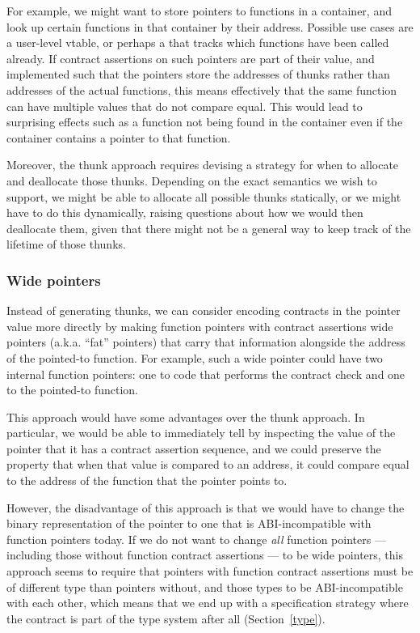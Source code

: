 For example, we might want to store pointers to functions in a container, and look up certain functions in that container by their address. Possible use cases are a user-level vtable, or perhaps a  that tracks which functions have been called already.  If contract assertions on such pointers are part of their value, and implemented such that the pointers store the addresses of thunks rather than addresses of the actual functions, this means effectively that the same function can have multiple values that do not compare equal. This would lead to surprising effects such as a function not being found in the container even if the container contains a pointer to that function.

Moreover, the thunk approach requires devising a strategy for when to allocate and deallocate those thunks. Depending on the exact semantics we wish to support, we might be able to allocate all possible thunks statically, or we might have to do this dynamically, raising questions about how we would then deallocate them, given that there might not be a general way to keep track of the lifetime of those thunks.


\subsubsection{Wide pointers}

Instead of generating thunks, we can consider encoding contracts in the pointer value more directly by making function pointers with contract assertions wide pointers (a.k.a. ``fat'' pointers) that carry that information alongside the address of the pointed-to function. For example, such a wide pointer could have two internal function pointers: one to code that performs the contract check and one to the pointed-to function. 

This approach would have some advantages over the thunk approach. In particular, we would be able to immediately tell by inspecting the value of the pointer that it has a contract assertion sequence, and we could preserve the property that when that value is compared to an address, it could compare equal to the address of the function that the pointer points to.

However, the disadvantage of this approach is that we would have to change the binary representation of the pointer to one that is ABI-incompatible with function pointers today. If we do not want to change \emph{all} function pointers --- including those without function contract assertions --- to be wide pointers, this approach seems to require that pointers with function contract assertions must be of different type than pointers without, and those types to be ABI-incompatible with each other, which means that we end up with a specification strategy where the contract is part of the type system after all (Section~\ref{type}).

